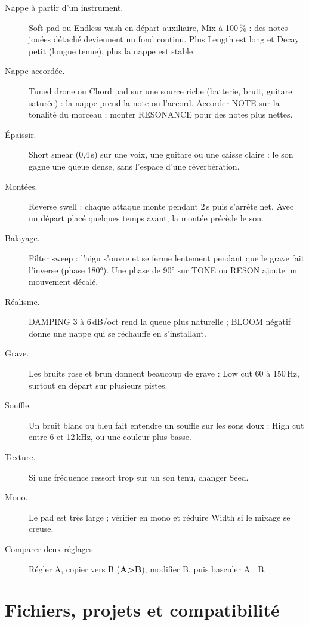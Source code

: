 \documentclass[a4paper,11pt]{article}
\newcommand{\ctl}[1]{\textsf{\textbf{#1}}}   %
\newcommand{\dB}{\,dB}
\begin{document}
\begin{description}
\item[Nappe à partir d'un instrument.] Soft pad ou Endless wash en départ auxiliaire, Mix à
  100\,\% : des notes jouées détaché deviennent un fond continu. Plus Length est long et Decay
  petit (longue tenue), plus la nappe est stable.
\item[Nappe accordée.] Tuned drone ou Chord pad sur une source riche (batterie, bruit, guitare
  saturée) : la nappe prend la note ou l'accord. Accorder NOTE sur la tonalité du morceau ; monter
  RESONANCE pour des notes plus nettes.
\item[Épaissir.] Short smear (0,4\,s) sur une voix, une guitare ou une caisse claire : le son
  gagne une queue dense, sans l'espace d'une réverbération.
\item[Montées.] Reverse swell : chaque attaque monte pendant 2\,s puis s'arrête net. Avec un
  départ placé quelques temps avant, la montée précède le son.
\item[Balayage.] Filter sweep : l'aigu s'ouvre et se ferme lentement pendant que le grave fait
  l'inverse (phase 180°). Une phase de 90° sur TONE ou RESON ajoute un mouvement décalé.
\item[Réalisme.] DAMPING 3 à 6\dB/oct rend la queue plus naturelle ; BLOOM négatif donne une
  nappe qui se réchauffe en s'installant.
\item[Grave.] Les bruits rose et brun donnent beaucoup de grave : Low cut 60 à 150\,Hz, surtout en
  départ sur plusieurs pistes.
\item[Souffle.] Un bruit blanc ou bleu fait entendre un souffle sur les sons doux : High cut entre
  6 et 12\,kHz, ou une couleur plus basse.
\item[Texture.] Si une fréquence ressort trop sur un son tenu, changer Seed.
\item[Mono.] Le pad est très large ; vérifier en mono et réduire Width si le mixage se creuse.
\item[Comparer deux réglages.] Régler A, copier vers B (\ctl{A>B}), modifier B, puis basculer A
  | B.
\end{description}

\section{Fichiers, projets et compatibilité}\label{sec:fichiers}
\end{document}
